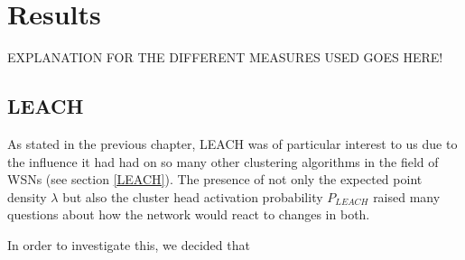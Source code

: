 \chapter{Results} \label{Results}

EXPLANATION FOR THE DIFFERENT MEASURES USED GOES HERE!

\section{LEACH}
As stated in the previous chapter, LEACH was of particular interest to us due to the influence it had had on so many other clustering algorithms in the field of WSNs (see section \ref{LEACH}). The presence of not only the expected point density $\lambda$ but also the cluster head activation probability $P_{LEACH}$ raised many questions about how the network would react to changes in both. 

In order to investigate this, we decided that 
